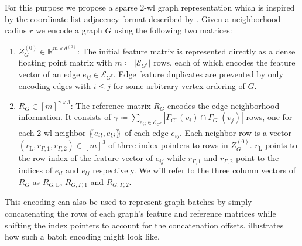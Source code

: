 For this purpose we propose a sparse 2-\acs{wl} graph representation which is inspired by the coordinate list adjacency format described by \citet{Fey2019}.
Given a neighborhood radius $r$ we encode a graph $G$ using the following two matrices:
\begin{enumerate}
	\item $Z_G^{(0)} \in \mathbb{R}^{m \times d^{(0)}}$:
		The initial feature matrix is represented directly as a dense floating point matrix with $m \coloneqq \left| \mathcal{E}_{G^r} \right|$ rows, each of which encodes the feature vector of an edge $e_{ij} \in \mathcal{E}_{G^r}$.
		Edge feature duplicates are prevented by only encoding edges with $i \leq j$ for some arbitrary vertex ordering of $G$.
	\item $R_G \in {[m]}^{\gamma \times 3}$:
		The reference matrix $R_G$ encodes the edge neighborhood information.
		It consists of $\gamma \coloneqq \sum_{e_{ij} \in \mathcal{E}_{G^r}} \left| \Gamma_{G^r}(v_i) \cap \Gamma_{G^r}(v_j) \right|$ rows, one for each 2-\acs{wl} neighbor $\ldblbrace e_{il}, e_{lj} \rdblbrace$ of each edge $e_{ij}$.
		Each neighbor row is a vector $(r_{\mathrm{L}}, r_{\Gamma,1}, r_{\Gamma,2}) \in {[m]}^3$ of three index pointers to rows in $Z_G^{(0)}$.
		$r_{\mathrm{L}}$ points to the row index of the feature vector of $e_{ij}$ while $r_{\Gamma,1}$ and $r_{\Gamma,2}$ point to the indices of $e_{il}$ and $e_{lj}$ respectively.
		We will refer to the three column vectors of $R_G$ as $R_{G, \mathrm{L}}$, $R_{G, \Gamma, 1}$ and $R_{G, \Gamma, 2}$.
\end{enumerate}
This encoding can also be used to represent graph batches by simply concatenating the rows of each graph's feature and reference matrices while shifting the index pointers to account for the concatenation offsets.
 illustrates how such a batch encoding might look like.
